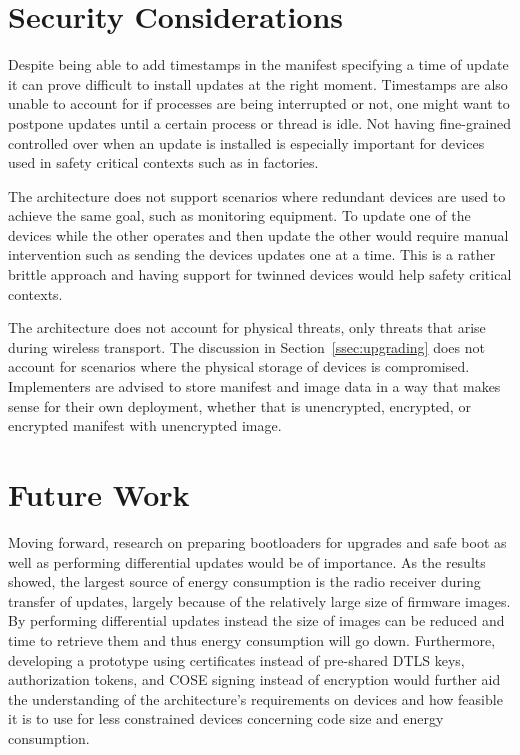 \documentclass[0-thesis.tex]{subfiles}
\begin{document}
\section{Security Considerations}
\label{sec:security-considerations}
Despite being able to add timestamps in the manifest specifying a time of update it can
prove difficult to install updates at the right moment. Timestamps are also unable to
account for if processes are being interrupted or not, one might want to postpone updates
until a certain process or thread is idle. Not having fine-grained controlled over when an
update is installed is especially important for devices used in safety critical contexts
such as in factories.

The architecture does not support scenarios where redundant devices are used to achieve
the same goal, such as monitoring equipment. To update one of the devices while the other
operates and then update the other would require manual intervention such as sending the
devices updates one at a time. This is a rather brittle approach and having support for
twinned devices would help safety critical contexts.

The architecture does not account for physical threats, only threats that arise during
wireless transport. The discussion in Section~\ref{ssec:upgrading} does not account for
scenarios where the physical storage of devices is compromised. Implementers are advised
to store manifest and image data in a way that makes sense for their own deployment,
whether that is unencrypted, encrypted, or encrypted manifest with unencrypted image.

\section{Future Work}
\label{sec:future-work}
Moving forward, research on preparing bootloaders for upgrades and safe boot as well as
performing differential updates would be of importance. As the results showed, the largest
source of energy consumption is the radio receiver during transfer of updates, largely
because of the relatively large size of firmware images. By performing differential
updates instead the size of images can be reduced and time to retrieve them and thus
energy consumption will go down. Furthermore, developing a prototype using certificates
instead of pre-shared DTLS keys, authorization tokens, and COSE signing instead of
encryption would further aid the understanding of the architecture's requirements on
devices and how feasible it is to use for less constrained devices concerning code size
and energy consumption. 
\end{document}
